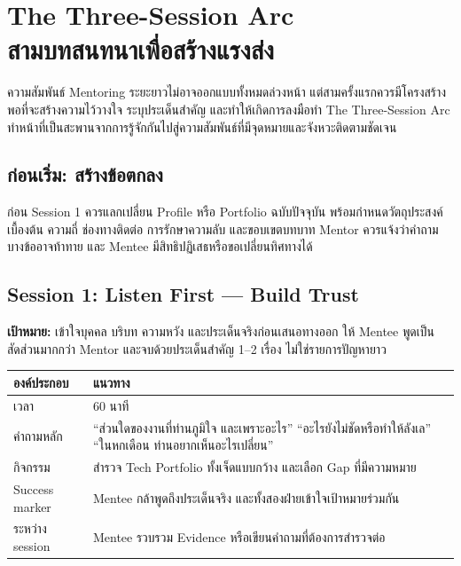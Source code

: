 \chapter{The Three-Session Arc\\สามบทสนทนาเพื่อสร้างแรงส่ง}

ความสัมพันธ์ Mentoring ระยะยาวไม่อาจออกแบบทั้งหมดล่วงหน้า แต่สามครั้งแรกควรมีโครงสร้างพอที่จะสร้างความไว้วางใจ ระบุประเด็นสำคัญ และทำให้เกิดการลงมือทำ The Three-Session Arc ทำหน้าที่เป็นสะพานจากการรู้จักกันไปสู่ความสัมพันธ์ที่มีจุดหมายและจังหวะติดตามชัดเจน


\section{ก่อนเริ่ม: สร้างข้อตกลง}
ก่อน Session 1 ควรแลกเปลี่ยน Profile หรือ Portfolio ฉบับปัจจุบัน พร้อมกำหนดวัตถุประสงค์เบื้องต้น ความถี่ ช่องทางติดต่อ การรักษาความลับ และขอบเขตบทบาท Mentor ควรแจ้งว่าคำถามบางข้ออาจท้าทาย และ Mentee มีสิทธิปฏิเสธหรือขอเปลี่ยนทิศทางได้

\section{Session 1: Listen First --- Build Trust}
\textbf{เป้าหมาย:} เข้าใจบุคคล บริบท ความหวัง และประเด็นจริงก่อนเสนอทางออก ให้ Mentee พูดเป็นสัดส่วนมากกว่า Mentor และจบด้วยประเด็นสำคัญ 1--2 เรื่อง ไม่ใช่รายการปัญหายาว

\begin{longtable}{P{.23\textwidth}P{.66\textwidth}}
\toprule
\textbf{องค์ประกอบ} & \textbf{แนวทาง}\\
\midrule
เวลา & 60 นาที\\
คำถามหลัก & \enquote{ส่วนใดของงานที่ท่านภูมิใจ และเพราะอะไร} \quad \enquote{อะไรยังไม่ชัดหรือทำให้ลังเล} \quad \enquote{ในหกเดือน ท่านอยากเห็นอะไรเปลี่ยน}\\
กิจกรรม & สำรวจ Tech Portfolio ทั้งเจ็ดแบบกว้าง และเลือก Gap ที่มีความหมาย\\
Success marker & Mentee กล้าพูดถึงประเด็นจริง และทั้งสองฝ่ายเข้าใจเป้าหมายร่วมกัน\\
ระหว่าง session & Mentee รวบรวม Evidence หรือเขียนคำถามที่ต้องการสำรวจต่อ\\
\bottomrule
\end{longtable}

